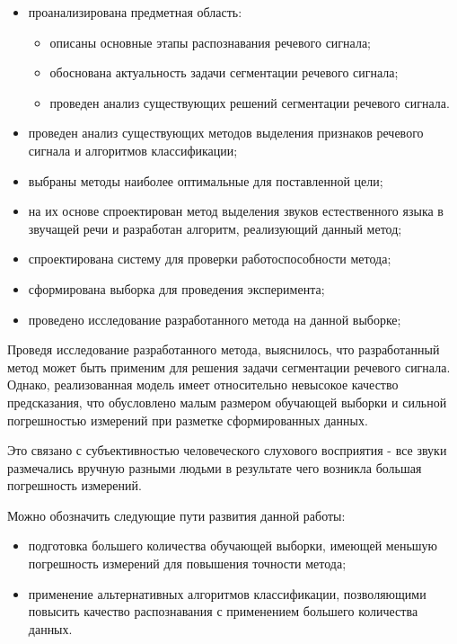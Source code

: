 \documentclass[utf8x, 14pt, oneside, a4paper]{article}
\begin{document}
	\begin{itemize}
		\item проанализирована предметная область:
		\begin{itemize}
			\item описаны основные этапы распознавания речевого сигнала;
			\item обоснована актуальность задачи сегментации речевого сигнала;
			\item проведен анализ существующих решений сегментации речевого сигнала.
		\end{itemize}
		\item проведен анализ существующих методов выделения признаков речевого сигнала и алгоритмов классификации;
		\item выбраны методы наиболее оптимальные для поставленной цели;
		\item на их основе спроектирован метод выделения звуков естественного языка в звучащей речи и разработан алгоритм, реализующий данный метод;
		\item спроектирована систему для проверки работоспособности метода;
		\item сформирована выборка для проведения эксперимента;
		\item проведено исследование разработанного метода на данной выборке;
	\end{itemize}

	Проведя исследование разработанного метода, выяснилось, что разработанный метод может быть применим для решения задачи сегментации речевого сигнала. Однако, реализованная модель имеет относительно невысокое качество предсказания, что обусловлено малым размером обучающей выборки и сильной погрешностью измерений при разметке сформированных данных. 
	
	Это связано с субъективностью человеческого слухового восприятия - все звуки размечались вручную разными людьми в результате чего возникла большая погрешность измерений.
	
	Можно обозначить следующие пути развития данной работы:
	
	\begin{itemize}
		\item подготовка большего количества обучающей выборки, имеющей меньшую погрешность измерений для повышения точности метода;
		\item применение альтернативных алгоритмов классификации, позволяющими повысить качество распознавания с применением большего количества данных.
	\end{itemize}
	
\end{document}
